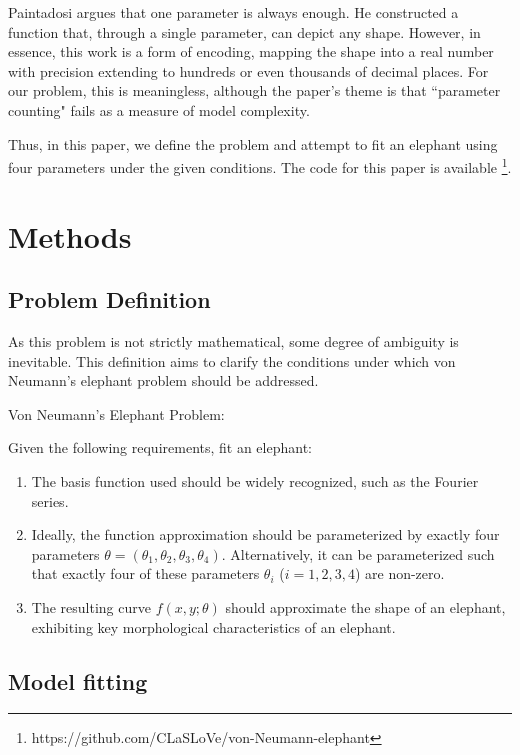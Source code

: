 \documentclass{article}
\begin{document}
Paintadosi \cite{piantadosiOneParameterAlways2018} argues that one parameter is always enough. He constructed a function that, through a single parameter, can depict any shape. However, in essence, this work is a form of encoding, mapping the shape into a real number with precision extending to hundreds or even thousands of decimal places. For our problem, this is meaningless, although the paper's theme is that ``parameter counting" fails as a measure of model complexity.

Thus, in this paper, we define the problem and attempt to fit an elephant using four parameters under the given conditions. The code for this paper is available \footnote{https://github.com/CLaSLoVe/von-Neumann-elephant}.

\section{Methods}

\subsection{Problem Definition}

As this problem is not strictly mathematical, some degree of ambiguity is inevitable. This definition aims to clarify the conditions under which von Neumann's elephant problem should be addressed.


Von Neumann's Elephant Problem:

Given the following requirements, fit an elephant:

\begin{enumerate}
	\item The basis function used should be widely recognized, such as the Fourier series.
	\item Ideally, the function approximation should be parameterized by exactly four parameters \( \theta = (\theta_1, \theta_2, \theta_3, \theta_4) \). Alternatively, it can be parameterized such that exactly four of these parameters \( \theta_i \) (\( i = 1, 2, 3, 4 \)) are non-zero.
	\item The resulting curve \( f(x,y; \theta) \) should approximate the shape of an elephant, exhibiting key morphological characteristics of an elephant.
\end{enumerate}



\subsection{Model fitting}
\end{document}
